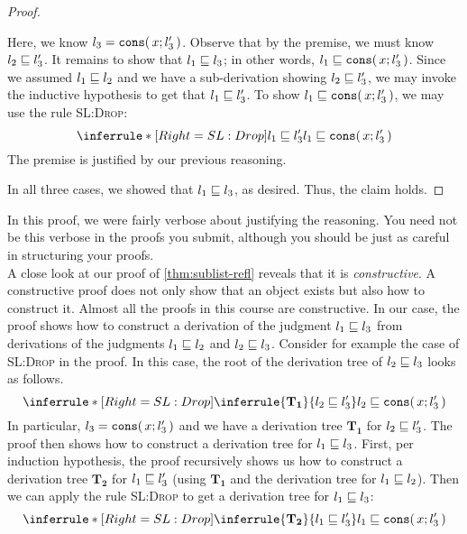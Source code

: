 \documentclass[11pt]{article}
\begin{document}
\begin{proof}
\begin{description}
      Here, we know $l_3 = {\mathtt{cons}}\mathtt{(}\,x; l_3'\,\mathtt{)}$.
      Observe that by the premise, we must know ${l_2} \sqsubseteq {l_3'}$.
      It remains to show that ${l_1} \sqsubseteq {l_3}$; in other words, ${l_1} \sqsubseteq {{\ensuremath{\mathtt{cons}}}\ensuremath{\mathtt{(}}\,x; l_3'\,\ensuremath{\mathtt{)}}}$.
      Since we assumed ${l_1} \sqsubseteq {l_2}$ and we have a sub-derivation showing ${l_2} \sqsubseteq {l_3'}$, we may invoke the inductive hypothesis to get that ${l_1} \sqsubseteq {l_3'}$.
      To show ${l_1} \sqsubseteq {{\ensuremath{\mathtt{cons}}}\ensuremath{\mathtt{(}}\,x; l_3'\,\ensuremath{\mathtt{)}}}$, we may use the rule \textsc{SL:Drop}:
      \[
        \Infer[SL:Drop]
          {\IsSublist{l_1}{l_3'}}
          {\IsSublist{l_1}{\ConsList{x}{l_3'}}}
      \]
      The premise is justified by our previous reasoning.
  \end{description}

  In all three cases, we showed that ${l_1} \sqsubseteq {l_3}$, as desired.
  Thus, the claim holds.
\end{proof}

In this proof, we were fairly verbose about justifying the reasoning.
You need not be this verbose in the proofs you submit, although you should be just as careful in structuring your proofs.
\\[\baselineskip]

A close look at our proof of \cref{thm:sublist-refl} reveals that it is \emph{constructive}.
%
A constructive proof does not only show that an object exists but also how to construct it.
%
Almost all the proofs in this course are constructive.
%
In our case, the proof shows how to construct a derivation of the judgment ${l_1} \sqsubseteq {l_3}$
from derivations of the judgments ${l_1} \sqsubseteq {l_2}$ and ${l_2} \sqsubseteq {l_3}$.
%
Consider for example the case of \textsc{SL:Drop} in the proof.
%
In this case, the root of the derivation tree of ${l_2} \sqsubseteq {l_3}$ looks as follows.
$$
\Infer[SL:Drop]
        {\inferrule{\mathbf{T_1}}{\IsSublist{l_2}{l_3'}}}
        {\IsSublist{l_2}{\ConsList{x}{l_3'}}}
$$
In particular, $l_3 = {\mathtt{cons}}\mathtt{(}\,x; l_3'\,\mathtt{)}$ and we have a derivation tree ${\mathbf{T_1}}$ for ${l_2} \sqsubseteq {l_3'}$.
%
The proof then shows how to construct a derivation tree for ${l_1} \sqsubseteq {l_3}$.
%
First, per induction hypothesis, the proof recursively shows us how to
construct a derivation tree ${\mathbf{T_2}}$ for ${l_1} \sqsubseteq {l'_3}$ (using ${\mathbf{T_1}}$ and the derivation tree
for ${l_1} \sqsubseteq {l_2}$).
%
Then we can apply the rule \textsc{SL:Drop} to get a derivation tree for
${l_1} \sqsubseteq {l_3}$:
$$
\Infer[SL:Drop]
        {\inferrule{\mathbf{T_2}}{\IsSublist{l_1}{l_3'}}}
        {\IsSublist{l_1}{\ConsList{x}{l_3'}}}
$$
\end{document}
